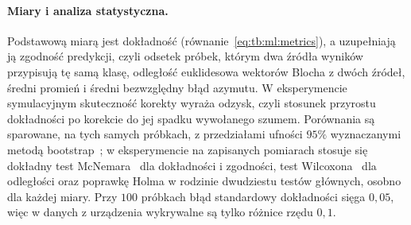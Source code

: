 
\paragraph{Miary i analiza statystyczna.}
Podstawową miarą jest dokładność (równanie~\eqref{eq:tb:ml:metrics}), a uzupełniają ją zgodność predykcji, czyli odsetek próbek, którym dwa źródła wyników przypisują tę samą klasę, odległość euklidesowa wektorów Blocha z dwóch źródeł, średni promień i średni bezwzględny błąd azymutu.
W eksperymencie symulacyjnym skuteczność korekty wyraża odzysk, czyli stosunek przyrostu dokładności po korekcie do jej spadku wywołanego szumem.
Porównania są sparowane, na tych samych próbkach, z przedziałami ufności $95\%$ wyznaczanymi metodą bootstrap~\cite{efron_bootstrap_1979}; w eksperymencie na zapisanych pomiarach stosuje się dokładny test McNemara~\cite{mcnemar_note_1947} dla dokładności i zgodności, test Wilcoxona~\cite{bib:statistics_wilc} dla odległości oraz poprawkę Holma w rodzinie dwudziestu testów głównych, osobno dla każdej miary.
Przy $100$ próbkach błąd standardowy dokładności sięga $0{,}05$, więc w danych z urządzenia wykrywalne są tylko różnice rzędu $0{,}1$.

